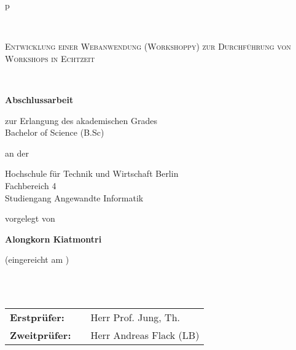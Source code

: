 \begin{center}
\begin{tabular}{p{\textwidth}}




\\

\begin{center}
\LARGE{\textsc{
Entwicklung einer Webanwendung (Workshoppy) zur
Durchführung von Workshops in Echtzeit\\
}}
\end{center}

\\

\begin{center}
\textbf{\Large{Abschlussarbeit}}
\end{center}

\begin{center}
zur Erlangung des akademischen Grades\\
Bachelor of Science (B.Sc)
\end{center}

\begin{center}
an der\\
\end{center}

\begin{center}
\large{Hochschule für Technik und Wirtschaft Berlin\\
Fachbereich 4\\
Studiengang Angewandte Informatik \\}
\end{center}

\begin{center}
vorgelegt von
\end{center}

\begin{center}
\large{\textbf{Alongkorn Kiatmontri}} \\
\end{center}

\begin{center}
\large{(eingereicht am )}
\end{center}

\\

\\

\begin{center}
\begin{tabular}{lll}
\textbf{Erstprüfer:} & & Herr Prof. Jung, Th.\\
\textbf{Zweitprüfer:} & & Herr Andreas Flack (LB)\\
\end{tabular}
\end{center}

\end{tabular}
\end{center}